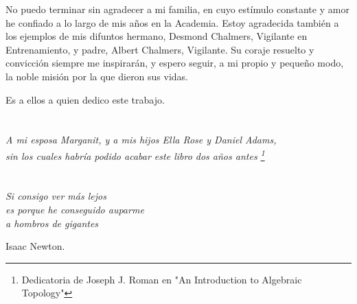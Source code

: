 No puedo terminar sin agradecer a mi familia, en cuyo estímulo constante y amor he confiado a lo largo de mis años en la Academia. Estoy agradecida también a los ejemplos de mis  difuntos hermano, Desmond Chalmers, Vigilante en Entrenamiento, y padre, Albert Chalmers, Vigilante. Su coraje resuelto y convicción siempre me inspirarán, y espero seguir, a mi propio y pequeño modo, la noble misión por la que dieron sus vidas. 

Es a ellos a quien dedico este trabajo.

\cleardoublepage %
\chapter*{}
\setlength{\leftmargin}{0.5\textwidth}
\setlength{\parsep}{0cm}
\addtolength{\topsep}{0.5cm}
\begin{flushright}
\small\em{
A mi esposa Marganit, y a mis hijos Ella Rose y Daniel Adams,\\
sin los cuales habría podido acabar este libro dos años antes \footnote{Dedicatoria de Joseph J. Roman en "An Introduction to Algebraic Topology"}
}
\end{flushright}


\cleardoublepage %
\chapter*{}
\setlength{\leftmargin}{0.5\textwidth}
\setlength{\parsep}{0cm}
\addtolength{\topsep}{0.5cm}
\begin{flushright}
\small\em{
Si consigo ver más lejos\\
es porque he conseguido auparme\\ 
a hombros de gigantes
}
\end{flushright}
\begin{flushright}
\small{
Isaac Newton.
}
\end{flushright}
\cleardoublepage %

